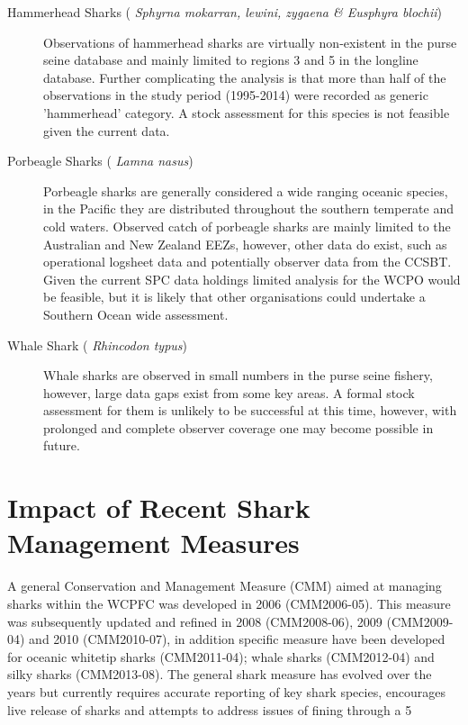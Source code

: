 \documentclass[12pt]{SCreport}
\begin{document}
\begin{description}
\item[ Hammerhead Sharks (\emph{ Sphyrna mokarran, lewini, zygaena \& Eusphyra blochii}) ]  Observations of hammerhead sharks are virtually non-existent in the purse seine database and mainly limited to regions 3 and 5 in the longline database. Further complicating the analysis is that more than half of the observations in the study period (1995-2014) were recorded as generic 'hammerhead' category. A stock assessment for this species is not feasible given the current data. 

\item[ Porbeagle Sharks (\emph{ Lamna nasus}) ] Porbeagle sharks are generally considered a wide ranging oceanic species, in the Pacific they are distributed throughout the southern temperate and cold waters. Observed catch of porbeagle sharks are mainly limited to the Australian and New Zealand EEZs, however, other data do exist, such as operational logsheet data and potentially observer data from the CCSBT. Given the current SPC data holdings limited analysis for the WCPO would be feasible, but it is likely that other organisations could undertake a Southern Ocean wide assessment.

\item[ Whale Shark (\emph{ Rhincodon typus}) ] Whale sharks are observed in small numbers in the purse seine fishery, however, large data gaps exist from some key areas. A formal stock assessment for them is unlikely to be successful at this time, however, with prolonged and complete observer coverage one may become possible in future. 


\end{description}

\section{Impact of Recent Shark Management Measures}

A general Conservation and Management Measure (CMM) aimed at managing sharks within the WCPFC was developed in 2006 (CMM2006-05). This measure was subsequently updated and refined in 2008 (CMM2008-06), 2009 (CMM2009-04) and 2010 (CMM2010-07), in addition specific measure have been developed for oceanic whitetip sharks (CMM2011-04); whale sharks (CMM2012-04) and silky sharks (CMM2013-08). The general shark measure has evolved over the years but currently requires accurate reporting of key shark species, encourages live release of sharks and attempts to address issues of fining through a 5%
\end{document}
